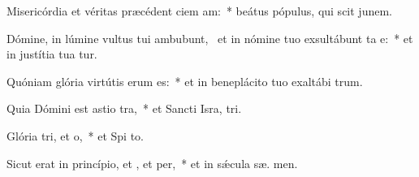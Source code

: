 \item Misericórdia et véritas præcédent ciem am:~* beátus pópulus, qui scit junem.
\item Dómine, in lúmine vultus tui ambubunt,~\pscross{} et in nómine tuo exsultábunt ta e:~* et in justítia tua tur.
\item Quóniam glória virtútis erum  es:~* et in beneplácito tuo exaltábi  trum.
\item Quia Dómini est astio tra,~* et Sancti Isra,  tri.
\item Glória tri, et o,~* et Spi to.
\item Sicut erat in princípio, et , et per,~* et in sǽcula sæ. men.

